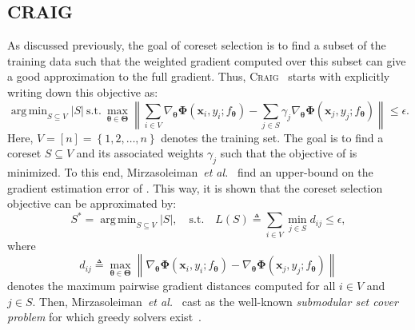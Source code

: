 \documentclass[runningheads]{llncs}
\newcommand{\norm}[1]{\left\lVert#1\right\rVert}
\newcommand{\etal}{\textit{et al.}}
\DeclareMathOperator*{\argmin}{arg\,min}
\begin{document}
\subsection{\textsc{CRAIG}}\label{ap:sec:sec:craig}
As discussed previously, the goal of coreset selection is to find a subset of the training data such that the weighted gradient computed over this subset can give a good approximation to the full gradient.
Thus, \textsc{Craig}~\cite{mirzasoleiman2020craig} starts with explicitly writing down this objective as:
\begin{equation}\label{eq:gradient_app_craig}
    \argmin_{S \subseteq V}|S| ~\text{s.t.}~\max_{\boldsymbol{\theta}\in \boldsymbol{\Theta}} \norm{\sum_{i \in V} \nabla_{\boldsymbol{\theta}}\boldsymbol{\Phi} \left(\boldsymbol{x}_{i}, y_{i}; f_{\boldsymbol{\theta}}\right)-\sum_{j \in S} \gamma_{j}\nabla_{\boldsymbol{\theta}}\boldsymbol{\Phi} \left(\boldsymbol{x}_{j}, y_{j}; f_{\boldsymbol{\theta}}\right)} \leq \epsilon.
\end{equation}
Here, $V=\left[n\right]=\left\{1, 2, \dots, n\right\}$ denotes the training set.
The goal is to find a coreset $S \subseteq V$ and its associated weights $\gamma_{j}$ such that the objective of  is minimized.
To this end, Mirzasoleiman~\etal~\cite{mirzasoleiman2020craig} find an upper-bound on the gradient estimation error of .
This way, it is shown that the coreset selection objective can be approximated by:
\begin{equation}\label{eq:craig_objective}
    S^{*}=\argmin_{S \subseteq V}|S|, \quad \text {s.t.} \quad L(S) \triangleq \sum_{i \in V} \min _{j \in S} d_{i j} \leq \epsilon,
\end{equation}
where
\begin{equation}\label{eq:craig_dij}
d_{i j} \triangleq \max _{\boldsymbol{\theta} \in \boldsymbol{\Theta}} \norm{ \nabla_{\boldsymbol{\theta}}\boldsymbol{\Phi} \left(\boldsymbol{x}_{i}, y_{i}; f_{\boldsymbol{\theta}}\right)-\nabla_{\boldsymbol{\theta}}\boldsymbol{\Phi} \left(\boldsymbol{x}_{j}, y_{j}; f_{\boldsymbol{\theta}}\right)}
\end{equation}
denotes the maximum pairwise gradient distances computed for all $i \in V$ and $j \in S$.
Then, Mirzasoleiman~\etal~\cite{mirzasoleiman2020craig} cast  as the well-known \textit{submodular set cover problem} for which greedy solvers exist~\cite{minoux1978accelerated,nemhauser1978analysis,wolsey1982greedy}.
\end{document}
